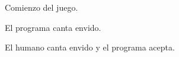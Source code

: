 \documentclass[12pt,a4paper]{article}
\begin{document}
\clearpage
\begin{figure}
\begin{center}
\noindent {}
\caption{Comienzo del juego.}
\end{center}
\end{figure}

\begin{figure}
\noindent {}
\caption{El programa canta envido.}
\end{figure}

\begin{figure}
\noindent {}
\caption {El humano canta envido y el programa acepta.}
\end{figure}
\end{document}
